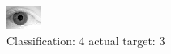 \begin{figure}[h!]
\begin{center}
\includegraphics[width=0.60\columnwidth]{figures/ID2124_class_4_target_3.png}
\end{center}
\caption{ Classification: 4 actual target: 3}
\label{fig:ID2124_class_4_target_3}
\end{figure}
